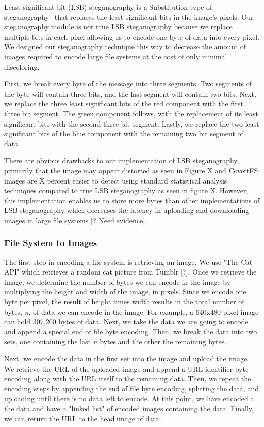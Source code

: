 Least significant bit (LSB) steganography is a Substitution type of steganography~\cite{Nosrati2011} that replaces the least significant bits in the image's pixels. Our steganography module is not true LSB steganography because we replace multiple bits in each pixel allowing us to encode one byte of data into every pixel. We designed our steganography technique this way to decrease the amount of images required to encode large file systems at the cost of only minimal discoloring. 

First, we break every byte of the message into three segments. Two segments of the byte will contain three bits, and the last segment will contain two bits. Next, we replace the three least significant bits of the red component with the first three bit segment. The green component follows, with the replacement of its least significant bits with the second three bit segment. Lastly, we replace the two least significant bits of the blue component with the remaining two bit segment of data. 

There are obvious drawbacks to our implementation of LSB steganography, primarily that the image may appear distorted as seen in Figure X and CovertFS images are X percent easier to detect using standard statistical analysis techniques compared to true LSB steganography as seen in figure X. However, this implementation enables us to store more bytes than other implementations of LSB steganography which decreases the latency in uploading and downloading images in large file systems [? Need evidence].
 
\subsubsection{File System to Images}

The first step in encoding a file system is retrieving an image. We use "The Cat API" which retrieves a random cat picture from Tumblr [?]. Once we retrieve the image, we determine the number of bytes we can encode in the image by multiplying the height and width of the image, in pixels. Since we encode one byte per pixel, the result of height times width results in the total number of bytes, \textit{n}, of data we can encode in the image. For example, a 640x480 pixel image can hold 307,200 bytes of data. Next, we take the data we are going to encode and append a special end of file byte encoding. Then, we break the data into two sets, one containing the last \textit{n} bytes and the other the remaining bytes. 

Next, we encode the data in the first set into the image and upload the image. We retrieve the URL of the uploaded image and append a URL identifier byte encoding along with the URL itself to the remaining data. Then, we repeat the encoding steps by appending the end of file byte encoding, splitting the data, and uploading until there is no data left to encode. At this point, we have encoded all the data and have a "linked list" of encoded images containing the data. Finally, we can return the URL to the head image of data. 